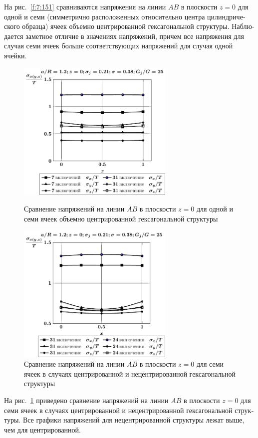 \begin{russian}
На рис.~\ref{f:7:151} сравниваются напряжения на линии $AB$ в плоскости $z=0$ для одной и семи (симметрично расположенных относительно центра цилиндрического образца) ячеек объемно центрированной гексагональной структуры. Наблюдается заметное отличие в значениях напряжений, причем все напряжения для случая семи ячеек больше соответствующих напряжений для случая одной ячейки.

\begin{figure}[h!]
\centering\footnotesize
\parbox[b]{7.5cm}{\centering\includegraphics[width=7.5cm]{inc31-7-a12-h10-r10-g25-z0.pdf}
\caption{Сравнение напряжений на линии $AB$ в плоскости $z=0$ для одной и семи ячеек объемно центрированной гексагональной структуры
\label{f:7:151}}}\hfil\hfil
\parbox[b]{7.5cm}{\centering\includegraphics[width=7.5cm]{inc31-24-a12-h10-r10-g25-z0.pdf}
\caption{Сравнение напряжений на линии $AB$ в плоскости $z=0$ для семи ячеек в случаях центрированной и нецентрированной гексагональной структуры
\label{f:7:152}}}
\end{figure}

На рис.~\ref{f:7:152} приведено сравнение напряжений на линии $AB$ в плоскости $z=0$ для семи ячеек в случаях центрированной и нецентрированной гексагональной структуры. Все графики напряжений для нецентрированной структуры лежат выше, чем для центрированной.


\end{russian}